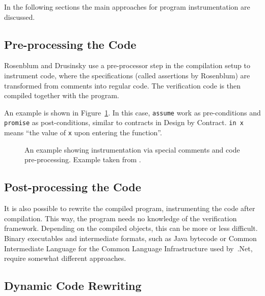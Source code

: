 In the following sections the main approaches for program instrumentation are
discussed.


\subsection{Pre-processing the Code}

Rosenblum \cite{rosenblum95practicalassertions} and Drusinsky
\cite{drusinsky00temporalrover} use a pre-processor step in the compilation
setup to instrument code, where the specifications (called assertions by
Rosenblum) are transformed from comments into regular code. The verification
code is then compiled together with the program.

An example is shown in Figure~\ref{figure-pre-processing-comments-example}. In
this case, \texttt{assume} work as pre-conditions and \texttt{promise} as
post-conditions, similar to contracts in Design by Contract. \texttt{in x}
means ``the value of \texttt{x} upon entering the function''.

\begin{figure}[h!]
	\begin{center}
	\begin{minipage}{0.7\textwidth}
    \lstset{language=C}
		
	\end{minipage}
	\end{center}
  \caption{An example showing instrumentation via special comments and code
    pre-processing. Example taken from \cite{rosenblum95practicalassertions}.}
	\label{figure-pre-processing-comments-example}
\end{figure}


\subsection{Post-processing the Code}

It is also possible to rewrite the compiled program, instrumenting the code
after compilation. This way, the program needs no knowledge of the verification
framework. Depending on the compiled objects, this can be more or less
difficult. Binary executables and intermediate formats, such as Java bytecode
or Common Intermediate Language for the Common Language Infrastructure used
by~.Net, require somewhat different approaches.


\subsection{Dynamic Code Rewriting}

